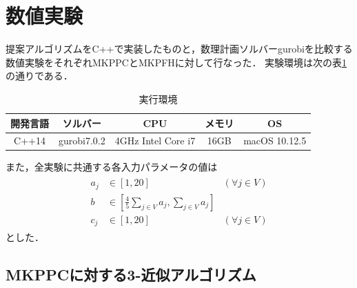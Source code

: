 \documentclass[11pt,dvipdfmx]{jarticle}
\numberwithin{equation}{section}
\begin{document}
\section{数値実験}
    提案アルゴリズムをC++で実装したものと，数理計画ソルバーgurobiを比較する数値実験をそれぞれMKPPCとMKPFHに対して行なった．
    実験環境は次の表\ref{kankyou}の通りである．\par
    \begin{table}[htb]
        \begin{center}
            \caption{実行環境}
            \begin{tabular}{|c|c|c|c|c|} \hline
                開発言語 & ソルバー & CPU & メモリ & OS \\ \hline
                C++14 & gurobi7.0.2& 4GHz Intel Core i7 & 16GB & macOS 10.12.5\\ \hline
            \end{tabular}
            \label{kankyou}
        \end{center}
    \end{table}\par
    また，全実験に共通する各入力パラメータの値は
    \begin{align}
        \begin{array}{rll}
            a_j &\in [1,20] & (\forall j\in V)\\ 
            b &\in \left[\displaystyle\frac{4}{5}\sum_{j\in V}{a_j}, \sum_{j\in V}{a_j}\right] & \\
            c_j &\in [1,20] & (\forall j\in V)
        \end{array}
    \end{align}
    とした．
    \newpage
    \subsection{MKPPCに対する3-近似アルゴリズム}
\end{document}
